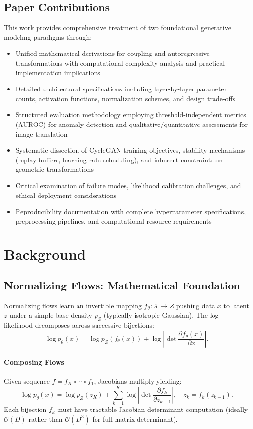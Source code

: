 \documentclass[conference]{IEEEtran}
\begin{document}
\subsection{Paper Contributions}
This work provides comprehensive treatment of two foundational generative modeling paradigms through:
\begin{itemize}
 \item Unified mathematical derivations for coupling and autoregressive transformations with computational complexity analysis and practical implementation implications
 \item Detailed architectural specifications including layer-by-layer parameter counts, activation functions, normalization schemes, and design trade-offs
 \item Structured evaluation methodology employing threshold-independent metrics (AUROC) for anomaly detection and qualitative/quantitative assessments for image translation
 \item Systematic dissection of CycleGAN training objectives, stability mechanisms (replay buffers, learning rate scheduling), and inherent constraints on geometric transformations
 \item Critical examination of failure modes, likelihood calibration challenges, and ethical deployment considerations
 \item Reproducibility documentation with complete hyperparameter specifications, preprocessing pipelines, and computational resource requirements
\end{itemize}

\section{Background}
\subsection{Normalizing Flows: Mathematical Foundation}
Normalizing flows learn an invertible mapping $f_{\theta}: X \to Z$ pushing data $x$ to latent $z$ under a simple base density $p_Z$ (typically isotropic Gaussian). The log-likelihood decomposes across successive bijections:
\begin{equation}
\log p_{\theta}(x) = \log p_Z(f_{\theta}(x)) + \log \left| \det \frac{\partial f_{\theta}(x)}{\partial x} \right|.
\end{equation}

\paragraph{Composing Flows} Given sequence $f = f_K \circ \cdots \circ f_1$, Jacobians multiply yielding:
\begin{equation}
\log p_{\theta}(x) = \log p_Z(z_K) + \sum_{k=1}^{K} \log \left| \det \frac{\partial f_k}{\partial z_{k-1}} \right|, \quad z_k = f_k(z_{k-1}).
\end{equation}
Each bijection $f_k$ must have tractable Jacobian determinant computation (ideally $\mathcal{O}(D)$ rather than $\mathcal{O}(D^3)$ for full matrix determinant).
\end{document}
